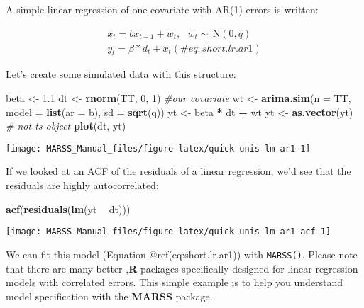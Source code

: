 \documentclass[12pt,]{book}
\newenvironment{Shaded}{\begin{snugshade}}{\end{snugshade}}
\newcommand{\CommentTok}[1]{\textcolor[rgb]{0.56,0.35,0.01}{\textit{#1}}}
\newcommand{\DataTypeTok}[1]{\textcolor[rgb]{0.13,0.29,0.53}{#1}}
\newcommand{\DecValTok}[1]{\textcolor[rgb]{0.00,0.00,0.81}{#1}}
\newcommand{\FloatTok}[1]{\textcolor[rgb]{0.00,0.00,0.81}{#1}}
\newcommand{\KeywordTok}[1]{\textcolor[rgb]{0.13,0.29,0.53}{\textbf{#1}}}
\newcommand{\NormalTok}[1]{#1}
\newcommand{\OperatorTok}[1]{\textcolor[rgb]{0.81,0.36,0.00}{\textbf{#1}}}
\newcommand{\StringTok}[1]{\textcolor[rgb]{0.31,0.60,0.02}{#1}}
\begin{document}
A simple linear regression of one covariate with AR(1) errors is written:

\begin{gather}
x_{t} = bx_{t-1} + w_{t}, \text{ } w_t \sim \,\text{N}(0,q)  \\
y_{t} = \beta*d_t + x_{t}
(\#eq:short.lr.ar1)
\end{gather}

Let's create some simulated data with this structure:

\begin{Shaded}
\begin{Highlighting}[]
\NormalTok{beta <-}\StringTok{ }\FloatTok{1.1}
\NormalTok{dt <-}\StringTok{ }\KeywordTok{rnorm}\NormalTok{(TT, }\DecValTok{0}\NormalTok{, }\DecValTok{1}\NormalTok{)  }\CommentTok{#our covariate}
\NormalTok{wt <-}\StringTok{ }\KeywordTok{arima.sim}\NormalTok{(}\DataTypeTok{n =}\NormalTok{ TT, }\DataTypeTok{model =} \KeywordTok{list}\NormalTok{(}\DataTypeTok{ar =}\NormalTok{ b), }\DataTypeTok{sd =} \KeywordTok{sqrt}\NormalTok{(q))}
\NormalTok{yt <-}\StringTok{ }\NormalTok{beta }\OperatorTok{*}\StringTok{ }\NormalTok{dt }\OperatorTok{+}\StringTok{ }\NormalTok{wt}
\NormalTok{yt <-}\StringTok{ }\KeywordTok{as.vector}\NormalTok{(yt)  }\CommentTok{# not ts object}
\KeywordTok{plot}\NormalTok{(dt, yt)}
\end{Highlighting}
\end{Shaded}

\begin{center}\texttt{[image: MARSS\_Manual\_files/figure-latex/quick-unis-lm-ar1-1]} \end{center}

If we looked at an ACF of the residuals of a linear regression, we'd see that the residuals are highly autocorrelated:

\begin{Shaded}
\begin{Highlighting}[]
\KeywordTok{acf}\NormalTok{(}\KeywordTok{residuals}\NormalTok{(}\KeywordTok{lm}\NormalTok{(yt }\OperatorTok{~}\StringTok{ }\NormalTok{dt)))}
\end{Highlighting}
\end{Shaded}

\begin{center}\texttt{[image: MARSS\_Manual\_files/figure-latex/quick-unis-lm-ar1-acf-1]} \end{center}

We can fit this model (Equation @ref(eq:short.lr.ar1)) with \texttt{MARSS()}. Please note that there are many better ,\textbf{R} packages specifically designed for linear regression models with correlated errors. This simple example is to help you understand model specification with the \textbf{MARSS} package.
\end{document}
